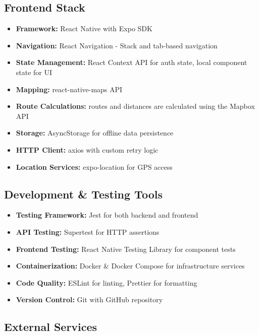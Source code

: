 \subsection{Frontend Stack}
\label{subsec:frontend_stack}

\begin{itemize}
    \item \textbf{Framework:} React Native with Expo SDK
    \item \textbf{Navigation:} React Navigation - Stack and tab-based navigation
    \item \textbf{State Management:} React Context API for auth state, local component state for UI
    \item \textbf{Mapping:} react-native-maps API
    \item \textbf{Route Calculations:} routes and distances are calculated using the Mapbox API
    \item \textbf{Storage:} AsyncStorage for offline data persistence
    \item \textbf{HTTP Client:} axios with custom retry logic
    \item \textbf{Location Services:} expo-location for GPS access
\end{itemize}

\subsection{Development \& Testing Tools}
\label{subsec:dev_tools}

\begin{itemize}
    \item \textbf{Testing Framework:} Jest for both backend and frontend
    \item \textbf{API Testing:} Supertest for HTTP assertions
    \item \textbf{Frontend Testing:} React Native Testing Library for component tests
    \item \textbf{Containerization:} Docker \& Docker Compose for infrastructure services
    \item \textbf{Code Quality:} ESLint for linting, Prettier for formatting
    \item \textbf{Version Control:} Git with GitHub repository
\end{itemize}

\subsection{External Services}
\label{subsec:external_services}


